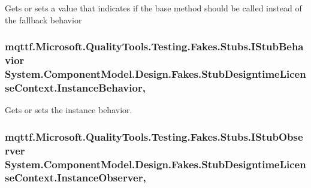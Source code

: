Gets or sets a value that indicates if the base method should be called instead of the fallback behavior

\hypertarget{class_system_1_1_component_model_1_1_design_1_1_fakes_1_1_stub_designtime_license_context_a6ba8f83bb051ce8ed7a10066fe49fe1d}{
\subsubsection[{Instance\-Behavior}]{\setlength{\rightskip}{0pt plus 5cm}mqttf.\-Microsoft.\-Quality\-Tools.\-Testing.\-Fakes.\-Stubs.\-I\-Stub\-Behavior System.\-Component\-Model.\-Design.\-Fakes.\-Stub\-Designtime\-License\-Context.\-Instance\-Behavior\hspace{0.3cm}{\ttfamily [get]}, {\ttfamily [set]}}}\label{class_system_1_1_component_model_1_1_design_1_1_fakes_1_1_stub_designtime_license_context_a6ba8f83bb051ce8ed7a10066fe49fe1d}


Gets or sets the instance behavior.

\hypertarget{class_system_1_1_component_model_1_1_design_1_1_fakes_1_1_stub_designtime_license_context_a585030508dfeb1a2bbc96b59ec18abb6}{
\subsubsection[{Instance\-Observer}]{\setlength{\rightskip}{0pt plus 5cm}mqttf.\-Microsoft.\-Quality\-Tools.\-Testing.\-Fakes.\-Stubs.\-I\-Stub\-Observer System.\-Component\-Model.\-Design.\-Fakes.\-Stub\-Designtime\-License\-Context.\-Instance\-Observer\hspace{0.3cm}{\ttfamily [get]}, {\ttfamily [set]}}}\label{class_system_1_1_component_model_1_1_design_1_1_fakes_1_1_stub_designtime_license_context_a585030508dfeb1a2bbc96b59ec18abb6}


